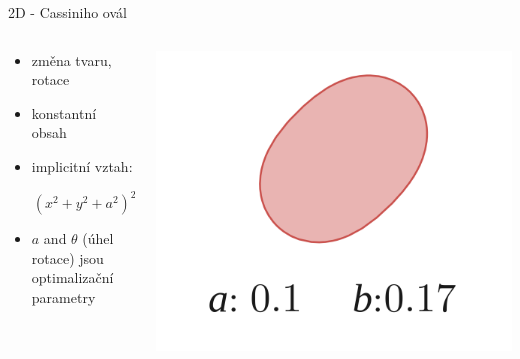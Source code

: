 \documentclass[aspectratio=169,xcolor=dvipsnames]{beamer}
\begin{document}
\begin{frame}{2D - Cassiniho ovál}
	\begin{columns}
		\begin{column}{.6\textwidth}
			\begin{itemize}
				\setlength\itemsep{1.4em}
				\item změna tvaru, rotace
				\item konstantní obsah
				\item implicitní vztah:
			\end{itemize}		
			\vspace{4mm}
			$$ \ \ \ \ \ \ \ \ \left( x^{2}+ y^{2}+a^{2} \right)^{2}-4 x ^{2} a^{2}-b^{4} = 0 $$
			\vspace{-3mm}
			\begin{itemize}
				\item $ a $ and $ \theta $ (úhel rotace) jsou optimalizační parametry
			\end{itemize}	
		\end{column}
		\begin{column}{.4\textwidth}
			\includegraphics[width=0.9\linewidth, trim={0 0 0 0}, clip]{Images/a1.png}			
		\end{column}
	\end{columns}	
\end{frame}
\end{document}
